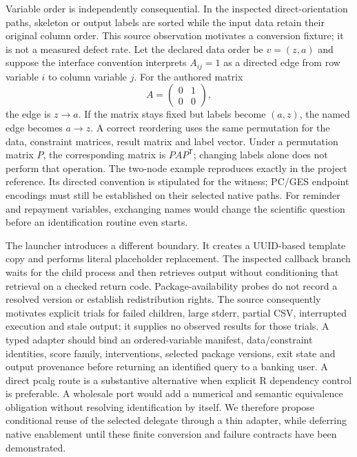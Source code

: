 Variable order is independently consequential. In the inspected direct-orientation paths,
skeleton or output labels are sorted while the input data retain their original column order.
This source observation motivates a conversion fixture; it is not a measured defect rate.
Let the declared data order be $v=(z,a)$ and suppose the interface convention interprets
$A_{ij}=1$ as a directed edge from row variable $i$ to column variable $j$. For the authored matrix
\[
 A=\begin{pmatrix}0&1\\0&0\end{pmatrix},
\]
the edge is $z\to a$. If the matrix stays fixed but labels become $(a,z)$, the named edge becomes
$a\to z$. A correct reordering uses the same permutation for the data, constraint matrices,
result matrix and label vector. Under a permutation matrix $P$, the corresponding matrix is
$PAP^{\mathsf T}$; changing labels alone does not perform that operation. The two-node example
reproduces exactly in the project reference. Its directed convention is stipulated for the
witness; PC/GES endpoint encodings must still be established on their selected native paths.
For reminder and repayment variables, exchanging names would change the scientific question
before an identification routine even starts.~\citep{exec28_bp_reference,exec28_bp_cdt}

The launcher introduces a different boundary. It creates a UUID-based template copy and
performs literal placeholder replacement. The inspected callback branch waits for the child
process and then retrieves output without conditioning that retrieval on a checked return code.
Package-availability probes do not record a resolved version or establish redistribution rights.
The source consequently motivates explicit trials for failed children, large stderr, partial
CSV, interrupted execution and stale output; it supplies no observed results for those trials.
A typed adapter should bind an ordered-variable manifest, data/constraint identities, score
family, interventions, selected package versions, exit state and output provenance before
returning an identified query to a banking user. A direct pcalg route is a substantive alternative
when explicit R dependency control is preferable. A wholesale port would add a numerical and
semantic equivalence obligation without resolving identification by itself. We therefore propose
conditional reuse of the selected delegate through a thin adapter, while deferring native
enablement until these finite conversion and failure contracts have been demonstrated.
\citep{exec28_bp_cdt}

